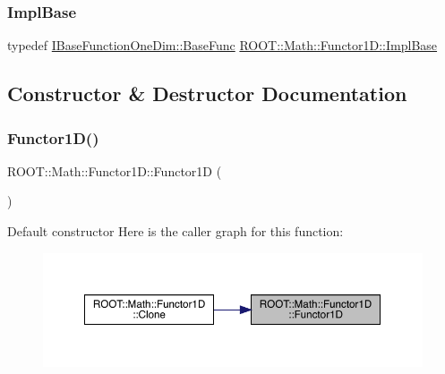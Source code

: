 \mbox{\label{classROOT_1_1Math_1_1Functor1D_a1ade2017edb7db0cbaf9a27a864f4dd3}} 
\subsubsection{\texorpdfstring{ImplBase}{ImplBase}\hspace{0.1cm}{\footnotesize\ttfamily [3/3]}}
{\footnotesize\ttfamily typedef \mbox{\hyperlink{classROOT_1_1Math_1_1IBaseFunctionOneDim_a87fee465cea6b03c55aa6bc1cf641cc9}{I\+Base\+Function\+One\+Dim\+::\+Base\+Func}} \mbox{\hyperlink{classROOT_1_1Math_1_1Functor1D_a1ade2017edb7db0cbaf9a27a864f4dd3}{R\+O\+O\+T\+::\+Math\+::\+Functor1\+D\+::\+Impl\+Base}}}



\subsection{Constructor \& Destructor Documentation}
\mbox{\label{classROOT_1_1Math_1_1Functor1D_ad3e410215d5ac30310dedb841bf6a88f}} 
\subsubsection{\texorpdfstring{Functor1D()}{Functor1D()}\hspace{0.1cm}{\footnotesize\ttfamily [1/12]}}
{\footnotesize\ttfamily R\+O\+O\+T\+::\+Math\+::\+Functor1\+D\+::\+Functor1D (\begin{DoxyParamCaption}{ }\end{DoxyParamCaption})\hspace{0.3cm}{\ttfamily [inline]}}

Default constructor Here is the caller graph for this function\+:\nopagebreak
\begin{figure}[H]
\begin{center}
\leavevmode
\includegraphics[width=350pt]{dc/d6d/classROOT_1_1Math_1_1Functor1D_ad3e410215d5ac30310dedb841bf6a88f_icgraph}
\end{center}
\end{figure}
\mbox{\label{classROOT_1_1Math_1_1Functor1D_a6aee539fa2657228e99a1fc542f9ff9e}} 
